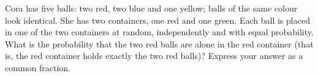 Cora has five balls: two red, two blue and one yellow; balls of the same colour look identical. She has two containers, one red and one green. Each ball is placed in one of the two containers at random, independently and with equal probability. What is the probability that the two red balls are alone in the red container (that is, the red container holds exactly the two red balls)? Express your answer as a common fraction.
